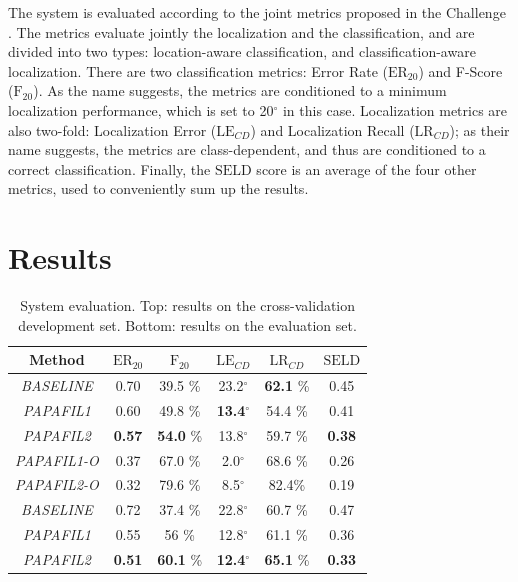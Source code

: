 The system is evaluated according to the joint metrics proposed in the Challenge \cite{Mesaros_2019_WASPAA}. 
The metrics evaluate jointly the localization and the classification, and are divided into two types: location-aware classification, and classification-aware localization. 
There are two classification metrics: Error Rate ($\text{ER}_{20}$) and F-Score ($\text{F}_{20}$). As the name suggests, the metrics are conditioned to a minimum localization performance, which is set to 20$^{\circ}$ in this case.
Localization metrics are also two-fold: Localization Error ($\text{LE}_{CD}$) and Localization Recall ($\text{LR}_{CD}$); 
as their name suggests, the metrics are class-dependent, and thus are conditioned to a correct classification.
Finally, the $\text{SELD}$ score is an average of the four other metrics, used to conveniently sum up the results. 




\section{Results}
\label{sec:results}

\begin{table}[t]
\begin{footnotesize}
\caption{System evaluation. Top: results on the cross-validation development set. Bottom: results on the evaluation set.}
    \begin{center}
    \begin{tabular}{cccccc}
    \toprule
    Method   & $\text{ER}_{20}$ & $\text{F}_{20}$   & $\text{LE}_{CD}$ & $\text{LR}_{CD}$ & $\text{SELD}$ \\
    \midrule
    \textit{BASELINE} & 0.70   & 39.5 \% & 23.2$^{\circ}$ & \textbf{62.1} \% & 0.45 \\
    \textit{PAPAFIL1} & 0.60 & 49.8 \% & \textbf{13.4}$^{\circ}$ & 54.4 \% &0.41\\
    \textit{PAPAFIL2} & \textbf{0.57} & \textbf{54.0} \% &13.8$^{\circ}$ & 59.7 \% & \textbf{0.38} \\
    
    \textit{PAPAFIL1-O} & 0.37 & 67.0 \% & 2.0$^{\circ}$ & 68.6 \% & 0.26 \\
    \textit{PAPAFIL2-O} & 0.32 & 79.6 \% & 8.5$^{\circ}$ & 82.4\% & 0.19 \\
	\midrule
	 \textit{BASELINE} & 0.72   & 37.4 \% & 22.8$^{\circ}$ & 60.7 \% & 0.47 \\
    \textit{PAPAFIL1} & 0.55 & 56 \% & 12.8$^{\circ}$ & 61.1 \% &0.36\\
    \textit{PAPAFIL2} & \textbf{0.51} & \textbf{60.1} \% &\textbf{12.4}$^{\circ}$ & \textbf{65.1} \% & \textbf{ 0.33} \\

    \bottomrule
    \end{tabular}
    \end{center}
    \label{tab:results}
\end{footnotesize}
\end{table}

